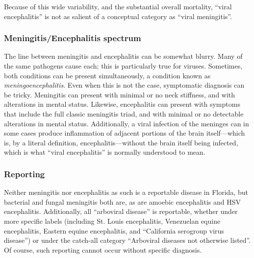 \documentclass[12pt]{article}
\newcommand{\eg}{\textit{e.g.}}
\newcommand{\cjh}{\textcolor{blue}{cjh}}
\newcommand{\tjh}{\textcolor{red}{tjh}}
\newcommand{\msg}[3]{(#1 $\rightarrow$ #2: #3)}
\newcommand{\mct}[1]{\msg\cjh\tjh{#1}}
\begin{document}
            Because of this wide variability, and the substantial overall mortality, ``viral encephalitis'' is not as salient of a conceptual category as ``viral meningitis''.

        \subsubsection{Meningitis/Encephalitis spectrum}
            \label{spectrum}
            The line between meningitis and encephalitis can be somewhat blurry. Many of the same pathogens cause each; this is particularly true for viruses. Sometimes, both conditions can be present simultaneously, a condition known as \textit{meningoencephalitis}. Even when this is not the case, symptomatic diagnosis can be tricky. Meningitis can present with minimal or no neck stiffness, and with alterations in mental status. Likewise, encephalitis can present with symptoms that include the full classic meningitis triad, and with minimal or no detectable alterations in mental status. Additionally, a viral infection of the meninges can in some cases produce inflammation of adjacent portions of the brain itself---which is, by a literal definition, encephalitis---without the brain itself being infected, which is what ``viral encephalitis'' is normally understood to mean\cite{ropper2014adams}.
        
        \subsubsection{Reporting}
            \label{reporting}
            Neither meningitis nor encephalitis as such is a reportable disease in Florida, but bacterial and fungal meningitis both are, as are amoebic encephalitis and HSV encephalitis. Additionally, all ``arboviral disease'' is reportable, whether under more specific labels (including St. Louis encephalitis, Venezuelan equine encephalitis, Eastern equine encephalitis, and ``California serogroup virus disease'') or under the catch-all category ``Arboviral diseases not otherwise listed''\cite{florida2016reportable}. Of course, such reporting cannot occur without specific diagnosis.

\end{document}
